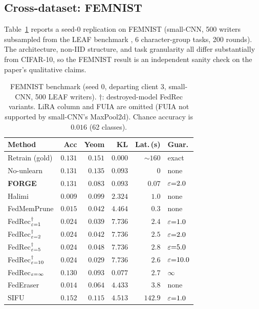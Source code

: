 \subsection{Cross-dataset: FEMNIST}
\label{sec:results-femnist}

Table~\ref{tab:femnist-benchmark} reports a seed-0 replication on FEMNIST
(small-CNN, 500 writers subsampled from the LEAF benchmark \cite{caldas2018leaf},
6 character-group tasks, 200 rounds). The architecture, non-IID structure, and task granularity
all differ substantially from CIFAR-10, so the FEMNIST result is an
independent sanity check on the paper's qualitative claims.

\begin{table}[t]
\centering
\scriptsize
\setlength{\tabcolsep}{3pt}
\begin{tabular}{lrrrrl}
\toprule
Method & Acc & Yeom & KL & Lat.\,(s) & Guar. \\
\midrule
Retrain (gold) & $0.131$ & $0.151$ & $0.000$ & ${\sim}160$ & exact \\
No-unlearn     & $0.131$ & $0.135$ & $0.093$ & $0$         & none  \\
\textbf{FORGE} & $\mathbf{0.131}$ & $\mathbf{0.083}$ & $\mathbf{0.093}$ & $\mathbf{0.07}$ & $\varepsilon{=}2.0$ \\
\midrule
Halimi \cite{halimi2022}              & $0.009$ & $0.099$ & $2.324$ & $1.0$   & none \\
FedMemPrune \cite{wei2026fedmemprune} & $0.015$ & $0.042$ & $4.464$ & $0.3$   & none \\
FedRec$^{\dag}_{\varepsilon{=}1}$            & $0.024$ & $0.039$ & $7.736$ & $2.4$   & $\varepsilon{=}1.0$ \\
FedRec$^{\dag}_{\varepsilon{=}2}$            & $0.024$ & $0.042$ & $7.736$ & $2.5$   & $\varepsilon{=}2.0$ \\
FedRec$^{\dag}_{\varepsilon{=}5}$            & $0.024$ & $0.048$ & $7.736$ & $2.8$   & $\varepsilon{=}5.0$ \\
FedRec$^{\dag}_{\varepsilon{=}10}$           & $0.024$ & $0.029$ & $7.736$ & $2.6$   & $\varepsilon{=}10.0$ \\
FedRec$_{\varepsilon{=}\infty}$              & $0.130$ & $0.093$ & $0.077$ & $2.7$   & $\infty$ \\
FedEraser \cite{liu2021federaser}     & $0.014$ & $0.064$ & $4.433$ & $3.8$   & none \\
SIFU \cite{fraboni2024sifu}           & $0.152$ & $0.115$ & $4.513$ & $142.9$ & $\varepsilon{=}1.0$ \\
\bottomrule
\end{tabular}
\caption{FEMNIST benchmark (seed 0, departing client 3, small-CNN, 500 LEAF writers). $\dag$: destroyed-model FedRec variants. LiRA column and FUIA are omitted (FUIA not supported by small-CNN's MaxPool2d). Chance accuracy is $0.016$ (62 classes).}
\label{tab:femnist-benchmark}
\end{table}

